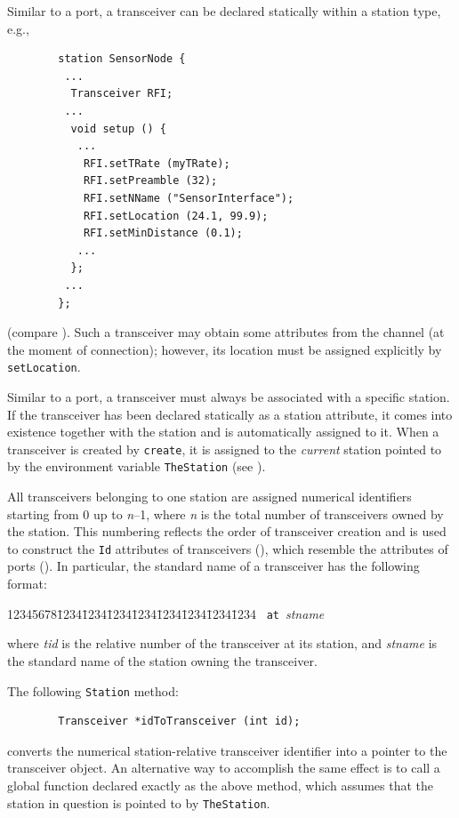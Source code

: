 Similar to a port, a transceiver can be declared statically within
a station type, e.g.,
\begin{verbatim}
        station SensorNode {
         ...
          Transceiver RFI;
         ...
          void setup () {
           ...
            RFI.setTRate (myTRate);
            RFI.setPreamble (32);
            RFI.setNName ("SensorInterface");
            RFI.setLocation (24.1, 99.9);
            RFI.setMinDistance (0.1);
           ...
          };
         ...
        };
\end{verbatim}
\noindent
(compare ).
Such a transceiver may obtain some attributes from the channel (at the
moment of connection); however,
its location must be assigned explicitly by {\tt setLocation}.

Similar to a port, a transceiver must always be
associated with a specific station.
If the transceiver has been declared statically
as a station attribute,
it comes into existence together with the station and
is automatically assigned to it.
When a transceiver is created by {\tt create}, it is assigned to
the {\em current\/} station pointed to by the environment
variable {\tt TheStation} (see ).

All transceivers belonging to one station are assigned numerical identifiers
starting from 0 up to {\em n\/}--1, where {\em n\/} is the total number of
transceivers owned by the station.
This numbering reflects the order of transceiver creation
and is used to construct the
{\tt Id} attributes of transceivers (), which resemble
the attributes of ports ().
In particular, the standard name of a transceiver has the following format:
{\tt\begin{tabbing}
12345678\=1234\=1234\=1234\=1234\=1234\=1234\=1234\=1234\kill
{}~{\tt at}~{\em stname}
\end{tabbing}}
\noindent
where {\em tid\/} is the relative number of the transceiver at its station, and
{\em stname\/} is the standard name of the station owning the transceiver.

The following {\tt Station} method:
\begin{verbatim}
        Transceiver *idToTransceiver (int id);
\end{verbatim}
converts the numerical station-relative transceiver identifier into
a pointer to the transceiver object.
An alternative way to accomplish the same effect
is to call a global function declared
exactly as the above method, which assumes that the station in question is
pointed to by {\tt TheStation}.

